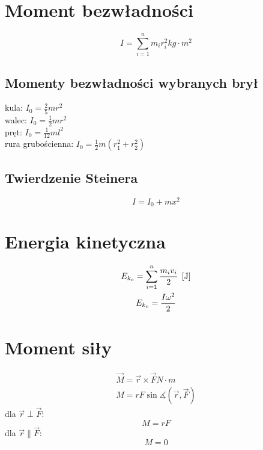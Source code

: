 \section{Moment bezwładności}
\begin{equation}
  I = \sum_{i=1}^n m_i r_i^2 \unit{kg \cdot m^2}
\end{equation}

\subsection{Momenty bezwładności wybranych brył}
kula: $I_0 = \frac 2 5 mr^2$\\
walec: $I_0 = \frac 1 2 mr^2$\\
pręt: $I_0 = \frac{1}{12} ml^2$\\
rura grubościenna: $I_0 = \frac 1 2 m(r_1^2 + r_2^2)$

\subsection{Twierdzenie Steinera}
\begin{equation*}
  I = I_0 + mx^2
\end{equation*}

\section{Energia kinetyczna}
\begin{gather*}
  E_{k_o} = \sum_{i=1}^n \frac{m_i v_i}{2} \;\left[\mathrm{J}\right]\\
  E_{k_o} = \frac{I \omega^2}{2}
\end{gather*}

\section{Moment siły}
\begin{equation}
  \begin{gathered}
    \vec M = \vec r \times \vec F \unit{N \cdot m}\\
    M = rF \sin\measuredangle(\vec r, \vec F)
  \end{gathered}
\end{equation}
dla $\vec r \perp \vec F$:
\begin{equation*}
  M = rF
\end{equation*}
dla $\vec r \parallel \vec F$:
\begin{equation*}
  M = 0
\end{equation*}

